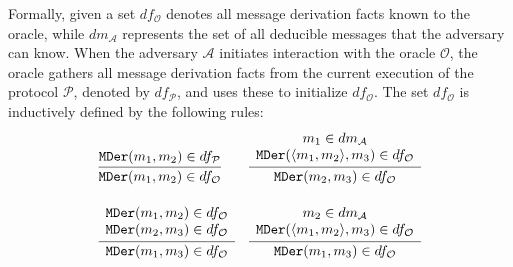 \documentclass[../main.tex]{subfiles}  %
\begin{document}
Formally, given a set $ df_\mathcal{O} $ denotes all message derivation facts known to the oracle, while $ dm_\mathcal{A} $ represents the set of all deducible messages that the adversary can know.
When the adversary $ \mathcal{A} $ initiates interaction with the oracle $ \mathcal{O} $, the oracle gathers all message derivation facts from the current execution of the protocol $\mathcal{P}$, denoted by $df_\mathcal{P}$, and uses these to initialize $ df_\mathcal{O} $.
The set $ df_\mathcal{O} $ is inductively defined by the following rules:
\begin{align*}
    &\infer
        {\text{\TFact{MDer}}(m_1, m_2) \in df_\mathcal{O}}
        {\text{\TFact{MDer}}(m_1, m_2) \in df_\mathcal{P}}
    &&
    \infer
        {\text{\TFact{MDer}}(m_2, m_3) \in df_\mathcal{O}}
        {\begin{array}{c} 
            m_1 \in dm_\mathcal{A} \\ 
            \text{\TFact{MDer}}(\langle m_1, m_2 \rangle, m_3) \in df_\mathcal{O}
        \end{array}} \\[1em]
    &\infer
        {\text{\TFact{MDer}}(m_1, m_3) \in df_\mathcal{O}}
        {\begin{array}{c} 
            \text{\TFact{MDer}}(m_1, m_2) \in df_\mathcal{O} \\ 
            \text{\TFact{MDer}}(m_2, m_3) \in df_\mathcal{O}
        \end{array}} 
    &&
    \infer
        {\text{\TFact{MDer}}(m_1, m_3) \in df_\mathcal{O}}
        {\begin{array}{c} 
            m_2 \in dm_\mathcal{A} \\ 
            \text{\TFact{MDer}}(\langle m_1, m_2 \rangle, m_3) \in df_\mathcal{O}
        \end{array}}
\end{align*}
\end{document}

